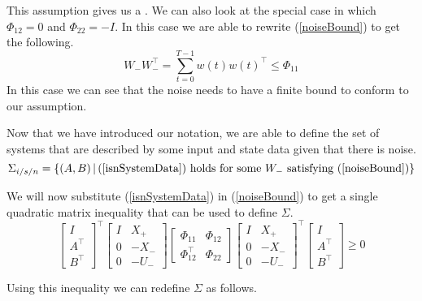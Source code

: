 This assumption gives us a .
We can also look at the special case in which $\Phi_{12} = 0$ and $\Phi_{22} = -I$. In this case we are able to rewrite (\ref{noiseBound}) to get the following.
\begin{equation} \label{noiseBoundSpecialCase}
	W_- W_-^\top = \sum^{T-1}_{t = 0}w(t)w(t)^\top \leq \Phi_{11}
\end{equation}
In this case we can see that the noise needs to have a finite bound to conform to our assumption. 

Now that we have introduced our notation, we are able to define the set of systems that are described by some input and state data given that there is noise.
\begin{equation} \label{isnSet}
\Sigma_{i/s/n} = \left\{ (A,B) \, | \, \mbox{(\ref{isnSystemData}) holds for some }W_- \mbox{ satisfying (\ref{noiseBound})} \right\}
\end{equation}

We will now substitute (\ref{isnSystemData}) in (\ref{noiseBound}) to get a single quadratic matrix inequality that can be used to define $\Sigma$.
\begin{equation} \label{noiseSystemQMI}
	\begin{bmatrix} I \\ A^\top \\ B^\top \end{bmatrix}^\top
	\begin{bmatrix} I&X_+ \\ 0 & -X_- \\ 0&-U_- \end{bmatrix}
	\begin{bmatrix} \Phi_{11} & \Phi_{12} \\ \Phi_{12}^\top & \Phi_{22} \end{bmatrix}
	\begin{bmatrix} I&X_+ \\ 0 & -X_- \\ 0&-U_- \end{bmatrix}^\top
	\begin{bmatrix} I \\ A^\top \\ B^\top \end{bmatrix} \geq 0
\end{equation}

Using this inequality we can redefine $\Sigma$ as follows.

